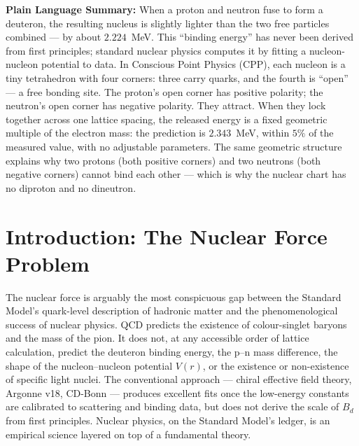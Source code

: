 \documentclass[11pt,letterpaper]{article}
\newcommand{\Bd}{B_{d}}
\begin{document}
\bigskip\noindent
\textbf{Plain Language Summary:}
When a proton and neutron fuse to form a deuteron, the resulting nucleus is slightly lighter than the two free particles combined --- by about $2.224$~MeV. This ``binding energy'' has never been derived from first principles; standard nuclear physics computes it by fitting a nucleon-nucleon potential to data. In Conscious Point Physics (CPP), each nucleon is a tiny tetrahedron with four corners: three carry quarks, and the fourth is ``open'' --- a free bonding site. The proton's open corner has positive polarity; the neutron's open corner has negative polarity. They attract. When they lock together across one lattice spacing, the released energy is a fixed geometric multiple of the electron mass: the prediction is $2.343$~MeV, within $5\%$ of the measured value, with no adjustable parameters. The same geometric structure explains why two protons (both positive corners) and two neutrons (both negative corners) cannot bind each other --- which is why the nuclear chart has no diproton and no dineutron.

\bigskip
\raggedright
\tableofcontents
\newpage

\section{Introduction: The Nuclear Force Problem}
\label{sec:intro}

The nuclear force is arguably the most conspicuous gap between the Standard Model's quark-level description of hadronic matter and the phenomenological success of nuclear physics. QCD predicts the existence of colour-singlet baryons and the mass of the pion. It does not, at any accessible order of lattice calculation, predict the deuteron binding energy, the p--n mass difference, the shape of the nucleon--nucleon potential $V(r)$, or the existence or non-existence of specific light nuclei. The conventional approach --- chiral effective field theory, Argonne v18, CD-Bonn --- produces excellent fits once the low-energy constants are calibrated to scattering and binding data, but does not derive the scale of $\Bd$ from first principles. Nuclear physics, on the Standard Model's ledger, is an empirical science layered on top of a fundamental theory.
\end{document}
